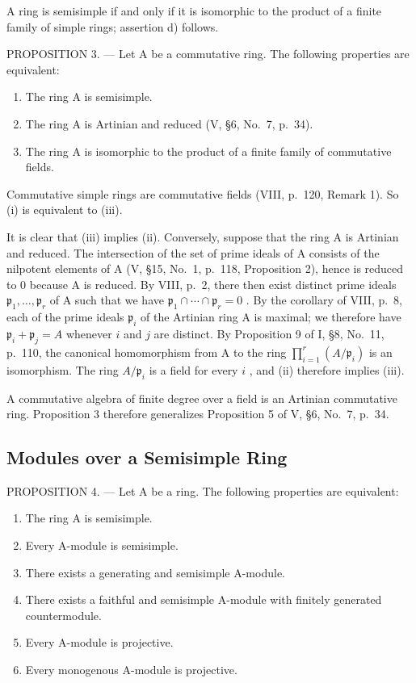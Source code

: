 A ring is semisimple if and only if it is isomorphic to the product of a finite family of simple rings; assertion d) follows.

PROPOSITION 3. --- Let A be a commutative ring. The following properties are equivalent:

\begin{enumerate}
\def\labelenumi{(\roman{enumi})}
\item
  The ring A is semisimple.
\item
  The ring A is Artinian and reduced (V, §6, No.~7, p.~34).
\item
  The ring A is isomorphic to the product of a finite family of commutative fields.
\end{enumerate}

Commutative simple rings are commutative fields (VIII, p.~120, Remark 1). So (i) is equivalent to (iii).

It is clear that (iii) implies (ii). Conversely, suppose that the ring A is Artinian and reduced. The intersection of the set of prime ideals of A consists of the nilpotent elements of A (V, §15, No.~1, p.~118, Proposition 2), hence is reduced to 0 because A is reduced. By VIII, p.~2, there then exist distinct prime ideals \(\mathfrak{p}_1, \ldots, \mathfrak{p}_r\) of A such that we have \(\mathfrak{p}_1 \cap \cdots \cap \mathfrak{p}_r = 0\) . By the corollary of VIII, p.~8, each of the prime ideals \(\mathfrak{p}_i\) of the Artinian ring A is maximal; we therefore have \(\mathfrak{p}_i + \mathfrak{p}_j = A\) whenever \(i\) and \(j\) are distinct. By Proposition 9 of I, §8, No.~11, p.~110, the canonical homomorphism from A to the ring \(\prod_{i=1}^{r} (A / \mathfrak{p}_i)\) is an isomorphism. The ring \(A / \mathfrak{p}_i\) is a field for every \(i\) , and (ii) therefore implies (iii).

A commutative algebra of finite degree over a field is an Artinian commutative ring. Proposition 3 therefore generalizes Proposition 5 of V, §6, No.~7, p.~34.

\subsection{Modules over a Semisimple Ring}

PROPOSITION 4. --- Let A be a ring. The following properties are equivalent:

\begin{enumerate}
\def\labelenumi{(\roman{enumi})}
\item
  The ring A is semisimple.
\item
  Every A-module is semisimple.
\item
  There exists a generating and semisimple A-module.
\item
  There exists a faithful and semisimple A-module with finitely generated countermodule.
\item
  Every A-module is projective.
\item
  Every monogenous A-module is projective.
\end{enumerate}

